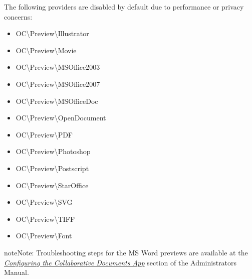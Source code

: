 \documentclass[letterpaper,10pt,english]{sphinxmanual}
\begin{document}
The following providers are disabled by default due to performance or privacy
concerns:
\begin{itemize}
\item {} 
OC\textbackslash{}Preview\textbackslash{}Illustrator

\item {} 
OC\textbackslash{}Preview\textbackslash{}Movie

\item {} 
OC\textbackslash{}Preview\textbackslash{}MSOffice2003

\item {} 
OC\textbackslash{}Preview\textbackslash{}MSOffice2007

\item {} 
OC\textbackslash{}Preview\textbackslash{}MSOfficeDoc

\item {} 
OC\textbackslash{}Preview\textbackslash{}OpenDocument

\item {} 
OC\textbackslash{}Preview\textbackslash{}PDF

\item {} 
OC\textbackslash{}Preview\textbackslash{}Photoshop

\item {} 
OC\textbackslash{}Preview\textbackslash{}Postscript

\item {} 
OC\textbackslash{}Preview\textbackslash{}StarOffice

\item {} 
OC\textbackslash{}Preview\textbackslash{}SVG

\item {} 
OC\textbackslash{}Preview\textbackslash{}TIFF

\item {} 
OC\textbackslash{}Preview\textbackslash{}Font

\end{itemize}

\begin{notice}{note}{Note:}
Troubleshooting steps for the MS Word previews are available
at the {\hyperref[configuration_files/collaborative_documents_configuration::doc]{\emph{Configuring the Collaborative Documents App}}}
section of the Administrators Manual.
\end{notice}
\end{document}
